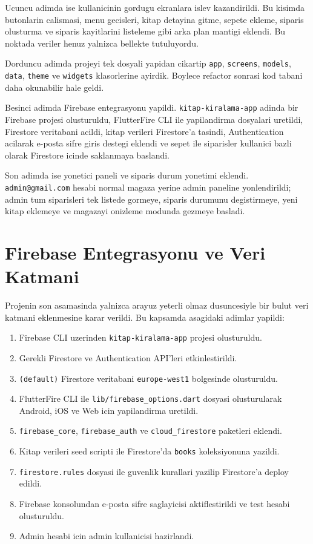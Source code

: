 \documentclass[12pt,a4paper]{article}
\begin{document}
Ucuncu adimda ise kullanicinin gordugu ekranlara islev kazandirildi. Bu kisimda butonlarin calismasi, menu gecisleri, kitap detayina gitme, sepete ekleme, siparis olusturma ve siparis kayitlarini listeleme gibi arka plan mantigi eklendi. Bu noktada veriler henuz yalnizca bellekte tutuluyordu.

Dorduncu adimda projeyi tek dosyali yapidan cikartip \verb|app|, \verb|screens|, \verb|models|, \verb|data|, \verb|theme| ve \verb|widgets| klasorlerine ayirdik. Boylece refactor sonrasi kod tabani daha okunabilir hale geldi.

Besinci adimda Firebase entegrasyonu yapildi. \verb|kitap-kiralama-app| adinda bir Firebase projesi olusturuldu, FlutterFire CLI ile yapilandirma dosyalari uretildi, Firestore veritabani acildi, kitap verileri Firestore'a tasindi, Authentication acilarak e-posta sifre giris destegi eklendi ve sepet ile siparisler kullanici bazli olarak Firestore icinde saklanmaya baslandi.

Son adimda ise yonetici paneli ve siparis durum yonetimi eklendi. \verb|admin@gmail.com| hesabi normal magaza yerine admin paneline yonlendirildi; admin tum siparisleri tek listede gormeye, siparis durumunu degistirmeye, yeni kitap eklemeye ve magazayi onizleme modunda gezmeye basladi.

\section{Firebase Entegrasyonu ve Veri Katmani}

Projenin son asamasinda yalnizca arayuz yeterli olmaz dusuncesiyle bir bulut veri katmani eklenmesine karar verildi. Bu kapsamda asagidaki adimlar yapildi:

\begin{enumerate}
  \item Firebase CLI uzerinden \verb|kitap-kiralama-app| projesi olusturuldu.
  \item Gerekli Firestore ve Authentication API'leri etkinlestirildi.
  \item \verb|(default)| Firestore veritabani \verb|europe-west1| bolgesinde olusturuldu.
  \item FlutterFire CLI ile \verb|lib/firebase_options.dart| dosyasi olusturularak Android, iOS ve Web icin yapilandirma uretildi.
  \item \verb|firebase_core|, \verb|firebase_auth| ve \verb|cloud_firestore| paketleri eklendi.
  \item Kitap verileri seed scripti ile Firestore'da \verb|books| koleksiyonuna yazildi.
  \item \verb|firestore.rules| dosyasi ile guvenlik kurallari yazilip Firestore'a deploy edildi.
  \item Firebase konsolundan e-posta sifre saglayicisi aktiflestirildi ve test hesabi olusturuldu.
  \item Admin hesabi icin admin kullanicisi hazirlandi.
\end{enumerate}
\end{document}
